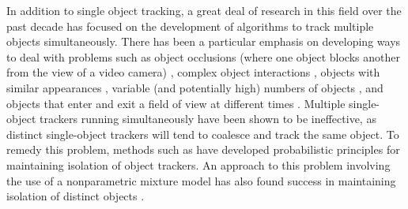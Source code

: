 \documentclass[twocolumn, final]{svjour3}
\begin{document}
In addition to single object tracking, a great deal of research in this field over the past decade has focused on the development of algorithms to track multiple objects simultaneously. There has been a particular emphasis on developing ways to deal with problems such as object occlusions (where one object blocks another from the view of a video camera) \cite{senior2006appearance, cucchiara2004probabilistic, zhou2003background}, complex object interactions \cite{khan_2004, mckenna2000tracking, dockstader2001multiple}, objects with similar appearances \cite{maccormick1999probabilistic, jepson_2003}, variable (and potentially high) numbers of objects \cite{reilly2010detection}, and objects that enter and exit a field of view at different times \cite{stauffer2003estimating, nedrich2010learning}. Multiple single-object trackers running simultaneously have been shown to be ineffective, as distinct single-object trackers will tend to coalesce and track the same object. To remedy this problem, methods such as \cite{maccormick1999probabilistic} have developed probabilistic principles for maintaining isolation of object trackers. An approach to this problem involving the use of a nonparametric mixture model has also found success in maintaining isolation of distinct objects \cite{vermaak_2003}.
\end{document}
